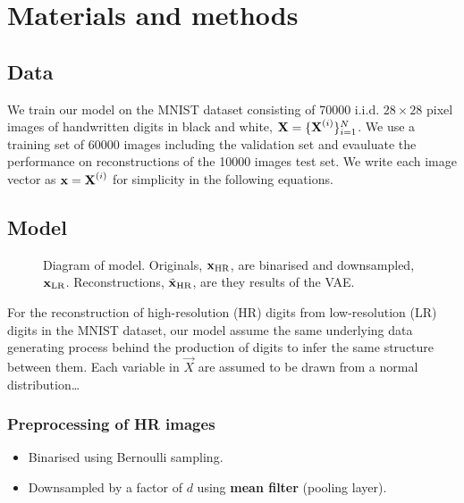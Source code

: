 \section{Materials and methods}
\label{sec:method}

\subsection{Data}
\label{sub:data}
We train our model on the MNIST dataset \cite{MNIST} consisting of 70000 i.i.d. $28 \times 28$ pixel images of handwritten digits in black and white, $\bm{\mathrm{X}} = \{\bm{\mathrm{X}}^{(i)}\}^N_{i=1}$. We use a training set of 60000 images including the validation set and evauluate the performance on reconstructions of the 10000 images test set.
We write each image vector as $\bm{\mathrm{x}} = \bm{\mathrm{X}}^{(i)}$ for simplicity in the following equations.

\subsection{Model}
\label{sub:the_model}

\begin{figure*}
	\centering
	
	\caption{Diagram of model. Originals, $\bm{\mathrm{x}}_{\text{HR}}$, are binarised and downsampled, $\bm{\mathrm{x}}_{\text{LR}}$. Reconstructions, $\tilde{\bm{\mathrm{x}}}_{\text{HR}}$, are they results of the VAE.}
	\label{fig:diagram}
\end{figure*}

For the reconstruction of high-resolution (HR) digits from low-resolution (LR) digits in the MNIST dataset, our model assume the same underlying data generating process behind the production of digits to infer the same structure between them. Each variable in $\vec{X}$ are assumed to be drawn from a normal distribution\dots 
{} \\


\subsubsection{Preprocessing of HR images}
\label{ssub:downsampling}

\begin{itemize}
	\item Binarised using Bernoulli sampling.
	\item Downsampled by a factor of $d$ using \textbf{mean filter} (pooling layer).
\end{itemize}

